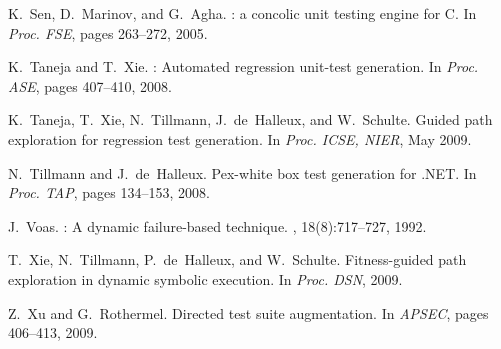 \documentclass{llncs}
\begin{document}
\begin{thebibliography}{10}
\begin{scriptsize}
K.~Sen, D.~Marinov, and G.~Agha.
: a concolic unit testing engine for {C}.
\newblock In {\em Proc. FSE}, pages 263--272, 2005.

K.~Taneja and T.~Xie.
: Automated regression unit-test generation.
\newblock In {\em Proc. ASE}, pages 407--410, 2008.

K.~Taneja, T.~Xie, N.~Tillmann, J.~de~Halleux, and W.~Schulte.
\newblock Guided path exploration for regression test generation.
\newblock In {\em Proc. ICSE, NIER}, May 2009.

N.~Tillmann and J.~de~Halleux.
\newblock Pex-white box test generation for {.{N}{E}{T}}.
\newblock In {\em Proc. TAP}, pages 134--153, 2008.

J.~Voas.
: A dynamic failure-based technique.
, 18(8):717--727, 1992.

T.~Xie, N.~Tillmann, P.~de~Halleux, and W.~Schulte.
\newblock Fitness-guided path exploration in dynamic symbolic execution.
\newblock In {\em Proc. DSN}, 2009.

Z.~Xu and G.~Rothermel.
\newblock Directed test suite augmentation.
\newblock In {\em APSEC}, pages 406--413, 2009.

\end{scriptsize}
\end{thebibliography}
\end{document}
